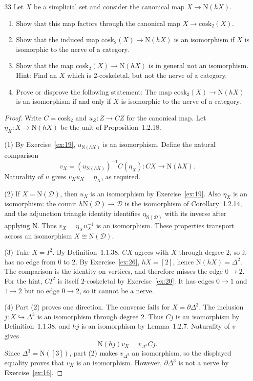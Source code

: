 \begin{exercise}{33}
Let $X$ be a simplicial set and consider the canonical map $X\to\mathrm N(hX)$.
\begin{enumerate}[label=(\arabic*),leftmargin=*,itemsep=0pt,parsep=0pt,
                  topsep=.5\baselineskip]
 \item Show that this map factors through the canonical map
       $X\to\mathrm{cosk}_2(X)$.
 \item Show that the induced map $\mathrm{cosk}_2(X)\to\mathrm N(hX)$
       is an isomorphism if $X$ is isomorphic to the nerve of a category.
 \item Show that the map $\mathrm{cosk}_2(X)\to\mathrm N(hX)$ is in general
       not an isomorphism. Hint: Find an $X$ which is $2$-coskeletal, but not
       the nerve of a category.
 \item Prove or disprove the following statement: The map
       $\mathrm{cosk}_2(X)\to\mathrm N(hX)$ is an isomorphism if and only if
       $X$ is isomorphic to the nerve of a category.
\end{enumerate}

\begin{proof}
Write $C=\mathrm{cosk}_2$ and $u_Z\colon Z\to CZ$ for the
canonical map. Let $\eta_X\colon X\to\mathrm N(hX)$ be the
unit of Proposition~1.2.18.

(1) By Exercise~\ref{ex:19}, $u_{\mathrm N(hX)}$ is an
isomorphism. Define the natural comparison
\[
 v_X=(u_{\mathrm N(hX)})^{-1}C(\eta_X)
 \colon CX\longrightarrow\mathrm N(hX).
\]
Naturality of $u$ gives $v_Xu_X=\eta_X$, as required.

(2) If $X=\mathrm N(\mathcal D)$, then $u_X$ is an isomorphism
by Exercise~\ref{ex:19}. Also $\eta_X$ is an isomorphism:
the counit $h\mathrm N(\mathcal D)\to\mathcal D$ is the
isomorphism of Corollary~1.2.14, and the adjunction triangle
identity identifies $\eta_{\mathrm N(\mathcal D)}$ with its
inverse after applying $\mathrm N$.
Thus $v_X=\eta_Xu_X^{-1}$ is an isomorphism. These properties
transport across an isomorphism $X\cong\mathrm N(\mathcal D)$.

(3) Take $X=I^2$. By Definition~1.1.38, $CX$ agrees with
$X$ through degree $2$, so it has no edge from $0$ to $2$.
By Exercise~\ref{ex:26}, $hX=[2]$, hence
$\mathrm N(hX)=\Delta^2$. The comparison is the identity on
vertices, and therefore misses the edge $0\to2$.
For the hint, $CI^2$ is itself $2$-coskeletal by
Exercise~\ref{ex:20}. It has edges $0\to1$ and $1\to2$ but
no edge $0\to2$, so it cannot be a nerve.

(4) Part (2) proves one direction. The converse fails for
$X=\partial\Delta^3$.
The inclusion $j\colon X\hookrightarrow\Delta^3$ is an
isomorphism through degree $2$. Thus $Cj$ is an isomorphism
by Definition~1.1.38, and $hj$ is an isomorphism by
Lemma~1.2.7. Naturality of $v$ gives
\[
 \mathrm N(hj)v_X=v_{\Delta^3}Cj.
\]
Since $\Delta^3=\mathrm N([3])$, part (2) makes
$v_{\Delta^3}$ an isomorphism, so the displayed equality
proves that $v_X$ is an isomorphism.
However, $\partial\Delta^3$ is not a nerve by
Exercise~\ref{ex:16}.
\end{proof}
\end{exercise}
